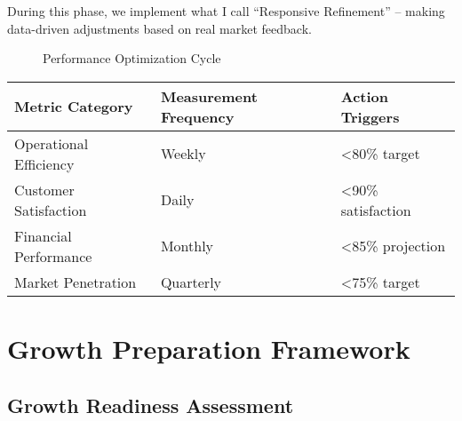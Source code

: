 During this phase, we implement what I call ``Responsive Refinement'' – making data-driven adjustments based on real market feedback.

\begin{figure}[htbp]
    \centering
    \caption{Performance Optimization Cycle}
    \label{fig:optimization-cycle}
\end{figure}

\begin{tcolorbox}[colback=white,colframe=primarydark,title=\textbf{Key Performance Indicators}]
\begin{center}
\begin{tabularx}{\textwidth}{>{\raggedright\arraybackslash}X >{\centering\arraybackslash}X >{\raggedright\arraybackslash}X}
    \toprule
    \textbf{Metric Category} & \textbf{Measurement Frequency} & \textbf{Action Triggers} \\
    \midrule
    Operational Efficiency & Weekly & <80\% target \\
    Customer Satisfaction & Daily & <90\% satisfaction \\
    Financial Performance & Monthly & <85\% projection \\
    Market Penetration & Quarterly & <75\% target \\
    \bottomrule
\end{tabularx}
\end{center}
\end{tcolorbox}

\section{Growth Preparation Framework}\label{sec:growth-preparation}

\subsection{Growth Readiness Assessment}\label{subsec:growth-readiness}

